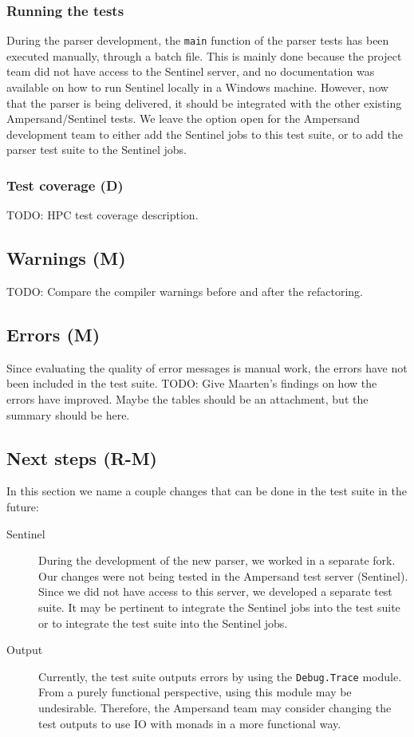   \subsubsection{Running the tests}
  During the parser development, the \texttt{main} function of the parser tests has been executed manually, through a batch file.
  This is mainly done because the project team did not have access to the Sentinel server, and no documentation was available on how to run Sentinel locally in a Windows machine.
  However, now that the parser is being delivered, it should be integrated with the other existing Ampersand/Sentinel tests.
  We leave the option open for the Ampersand development team to either add the Sentinel jobs to this test suite, or to add the parser test suite to the Sentinel jobs.
  
  \subsubsection{Test coverage (D)}
  TODO: HPC test coverage description.
  
\subsection{Warnings (M)}
TODO: Compare the compiler warnings before and after the refactoring.

\subsection{Errors (M)}
  Since evaluating the quality of error messages is manual work, the errors have not been included in the test suite.
  TODO: Give Maarten's findings on how the errors have improved. Maybe the tables should be an attachment, but the summary should be here.

\subsection{Next steps (R-M)}
\label{subsec:test-next-steps}
  In this section we name a couple changes that can be done in the test suite in the future:
  \begin{description}
    \item[Sentinel] During the development of the new parser, we worked in a separate fork.
      Our changes were not being tested in the Ampersand test server (Sentinel).
      Since we did not have access to this server, we developed a separate test suite.
      It may be pertinent to integrate the Sentinel jobs into the test suite or to integrate the test suite into the Sentinel jobs.
    
    \item[Output] Currently, the test suite outputs errors by using the \texttt{Debug.Trace} module.
      From a purely functional perspective, using this module may be undesirable.
      Therefore, the Ampersand team may consider changing the test outputs to use IO with monads in a more functional way.
  \end{description}
